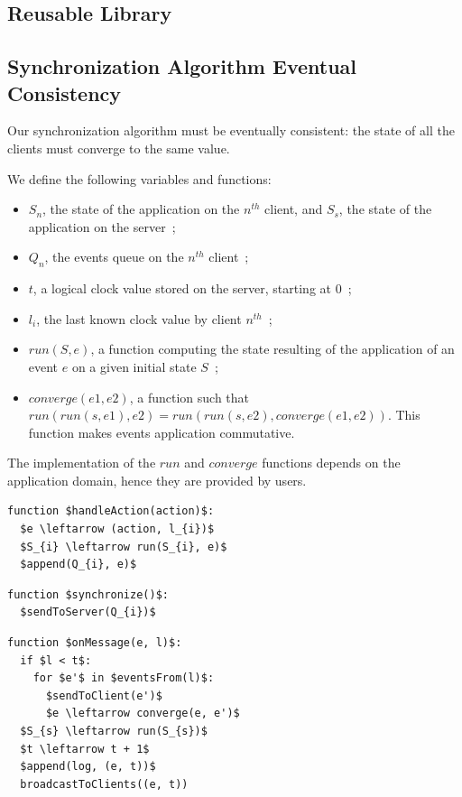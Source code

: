 \documentclass{acm_proc_article-sp}
\begin{document}
\subsection{Reusable Library}

\subsection{Synchronization Algorithm Eventual Consistency}

Our synchronization algorithm must be eventually consistent: the state of all the clients must converge to the same value.

We define the following variables and functions:

\begin{itemize}
 \item $S_{n}$, the state of the application on the $n^{th}$ client, and $S_{s}$, the state of the application on the server~;
 \item $Q_{n}$, the events queue on the $n^{th}$ client~;
 \item $t$, a logical clock value stored on the server, starting at 0~;
 \item $l_{i}$, the last known clock value by client $n^{th}$~;
 \item $run(S,e)$, a function computing the state resulting of the application of an event $e$ on a given initial state $S$~;
 \item $converge(e1,e2)$, a function such that $run(run(s,e1),e2)=run(run(s,e2),converge(e1,e2))$. This function makes events application commutative.
\end{itemize}

The implementation of the $run$ and $converge$ functions depends on the application domain, hence they are provided by users.

\begin{lstlisting}[mathescape]
function $handleAction(action)$:
  $e \leftarrow (action, l_{i})$
  $S_{i} \leftarrow run(S_{i}, e)$
  $append(Q_{i}, e)$
\end{lstlisting}

\begin{lstlisting}[mathescape]
function $synchronize()$:
  $sendToServer(Q_{i})$
\end{lstlisting}

\begin{lstlisting}[mathescape]
function $onMessage(e, l)$:
  if $l < t$:
    for $e'$ in $eventsFrom(l)$:
      $sendToClient(e')$
      $e \leftarrow converge(e, e')$
  $S_{s} \leftarrow run(S_{s})$
  $t \leftarrow t + 1$
  $append(log, (e, t))$
  broadcastToClients((e, t))
\end{lstlisting}
\end{document}
